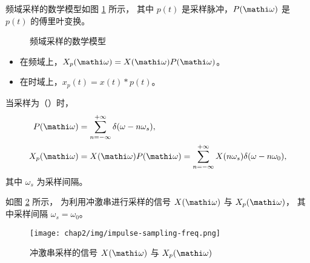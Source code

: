 \begin{definition}[频域采样]
    频域采样的数学模型如图 \ref{fig:sampling-freq-math-model} 所示，
    其中 $p(t)$ 是采样脉冲，$P(\mathi \omega)$ 是 $p(t)$ 的傅里叶变换。
    \begin{figure}[H]
        \centering
        \caption{频域采样的数学模型}
        \label{fig:sampling-freq-math-model}
    \end{figure}

    \begin{itemize}
        \item 在频域上，$X_p(\mathi \omega) = X(\mathi \omega) P(\mathi \omega)$。
        \item 在时域上，$x_p(t) = x(t) * p(t)$。
    \end{itemize}
    当采样为（）时，
    \begin{align*}
        P(\mathi\omega) & = \sum_{n = -\infty}^{+\infty}\delta(\omega - n\omega_s), \\
        X_p(\mathi\omega) & = X(\mathi\omega)P(\mathi\omega) = \sum_{n = -\infty}^{+\infty}X(n\omega_s)\delta(\omega - n\omega_0),
    \end{align*}
    其中 $\omega_s$ 为采样间隔。
\end{definition}

\begin{example}
    如图 \ref{fig:impulse-sampling-freq} 所示，
    为利用冲激串进行采样的信号 $X(\mathi\omega)$ 与 $X_p(\mathi\omega)$，
    其中采样间隔 $\omega_s = \omega_0$。
    \begin{figure}[H]
        \centering
        \texttt{[image: chap2/img/impulse-sampling-freq.png]}
        \caption{冲激串采样的信号 $X(\mathi\omega)$ 与 $X_p(\mathi\omega)$}
        \label{fig:impulse-sampling-freq}
    \end{figure}
\end{example}

